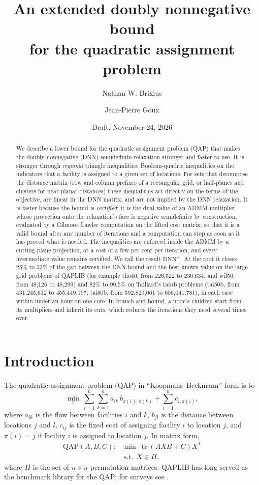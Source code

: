 \documentclass[11pt]{article}
\title{An extended doubly nonnegative bound\\ for the quadratic assignment problem}
\author{Nathan W. Brixius \and Jean-Pierre Goux}
\date{Draft, November 24, 2026}
\theoremstyle{remark}
\newcommand{\tr}{\operatorname{tr}}
\newcommand{\DNNp}{\mathrm{DNN}^{+}}
\begin{document}
\maketitle

\begin{abstract}
We describe a lower bound for the quadratic assignment problem (QAP) that makes
the doubly nonnegative (DNN) semidefinite relaxation stronger and faster to use.
It is stronger through \emph{regional} triangle inequalities: Boolean-quadric
inequalities on the indicators that a facility is assigned to a given set of
locations. For sets that decompose the distance matrix (row and column prefixes
of a rectangular grid, or half-planes and clusters for near-planar distances)
these inequalities act directly on the terms of the objective, are linear in the
DNN matrix, and are not implied by the DNN relaxation. It is faster because the
bound is \emph{certified}: it is the dual value of an ADMM multiplier whose
projection onto the relaxation's face is negative semidefinite by construction,
evaluated by a Gilmore--Lawler computation on the lifted cost matrix, so that
it is a valid bound after any number of iterations and a computation can stop
as soon as it has proved what is needed. The inequalities are enforced inside
the ADMM by a cutting-plane projection, at a cost of a few per cent per
iteration, and every intermediate value remains certified. We call the result $\DNNp$. At the root it closes 25\% to 33\% of the gap between
the DNN bound and the best known value on the large grid problems of QAPLIB
(for example tho40, from 226,522 to 230,634, and wil50, from 48,126 to 48,299)
and 82\% to 99.5\% on Taillard's tai$n$b problems (tai50b, from 431,245,612 to
455,449,197; tai60b, from 592,829,061 to 606,041,781), in each case within
under an hour on one core. In branch and bound, a node's children start from its
multipliers and inherit its cuts, which reduces the iterations they need
several times over.
\end{abstract}

\section{Introduction}

The quadratic assignment problem (QAP) in ``Koopmans--Beckmann'' form is to
\[
  \min_{\pi}\ \sum_{i=1}^n\sum_{k=1}^n a_{ik}\,b_{\pi(i),\pi(k)} + \sum_{i=1}^n c_{i,\pi(i)},
\]
where $a_{ik}$ is the flow between facilities $i$ and $k$, $b_{jl}$ is the
distance between locations $j$ and $l$, $c_{ij}$ is the fixed cost of assigning
facility $i$ to location $j$, and $\pi(i) = j$ if facility $i$ is assigned to
location $j$. In matrix form,
\begin{equation}\label{eq:qap}
  \begin{array}{rl}
  \mathrm{QAP}(A,B,C): & \min\ \tr(AXB + C)X^T\\
  & \ \text{s.t.}\ \ X\in\Pi,
  \end{array}
\end{equation}
where $\Pi$ is the set of $n\times n$ permutation matrices. QAPLIB \cite{qaplib}
has long served as the benchmark library for the QAP; for surveys see
\cite{burkardsurvey,loiola}.
\end{document}
